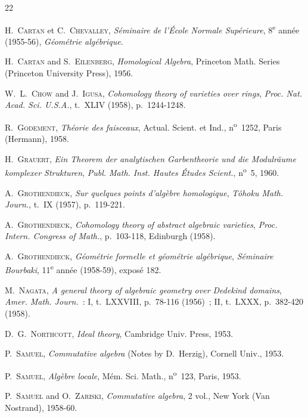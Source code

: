 \begin{thebibliography}{22}

H.~\textsc{Cartan} et C.~\textsc{Chevalley},
\emph{Séminaire de l'École Normale Supérieure},
8\textsuperscript{e} année (1955-56), \emph{Géométrie algébrique}.

H.~\textsc{Cartan} and S.~\textsc{Eilenberg},
\emph{Homological Algebra}, Princeton Math. Series (Princeton University
Press), 1956.

W.~L.~\textsc{Chow} and J.~\textsc{Igusa},
\emph{Cohomology theory of varieties over rings},
\emph{Proc. Nat. Acad. Sci. U.S.A.}, t.~XLIV (1958), p.~1244-1248.

R.~\textsc{Godement}, \emph{Théorie des faisceaux}, Actual. Scient. et Ind.,
n\textsuperscript{o}~1252, Paris (Hermann), 1958.

H.~\textsc{Grauert},
\emph{Ein Theorem der analytischen Garbentheorie und die Modulräume komplexer
Strukturen}, \emph{Publ. Math. Inst. Hautes Études Scient.},
n\textsuperscript{o}~5, 1960.

A.~\textsc{Grothendieck}, \emph{Sur quelques points d'algèbre homologique},
\emph{Tôhoku Math. Journ.}, t.~IX (1957), p.~119-221.

A.~\textsc{Grothendieck},
\emph{Cohomology theory of abstract algebraic varieties},
\emph{Proc. Intern. Congress of Math.}, p.~103-118, Edinburgh (1958).

A.~\textsc{Grothendieck},
\emph{Géométrie formelle et géométrie algébrique},
\emph{Séminaire Bourbaki}, 11\textsuperscript{e} année (1958-59), exposé 182.

M.~\textsc{Nagata},
\emph{A general theory of algebraic geometry over Dedekind domains},
\emph{Amer. Math. Journ.}~: I, t.~LXXVIII, p.~78-116 (1956)~; II, t.~LXXX,
p.~382-420 (1958).

D.~G.~\textsc{Northcott}, \emph{Ideal theory}, Cambridge Univ. Press, 1953.

P.~\textsc{Samuel}, \emph{Commutative algebra} (Notes by D.~Herzig), Cornell
Univ., 1953.

P.~\textsc{Samuel}, \emph{Algèbre locale}, Mém. Sci. Math.,
n\textsuperscript{o}~123, Paris, 1953.

P.~\textsc{Samuel} and O.~\textsc{Zariski},
\emph{Commutative algebra}, 2 vol., New York (Van Nostrand), 1958-60.


\end{thebibliography}
